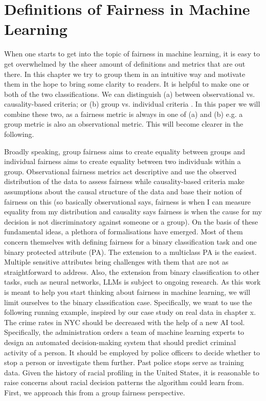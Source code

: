 \section*{Definitions of Fairness in Machine Learning}
When one starts to get into the topic of fairness in machine learning, it is easy to get overwhelmed by the sheer amount of definitions and metrics that are out there. In this chapter we try to group them in an intuitive way and motivate them in the hope to bring some clarity to readers. It is helpful to make one or both of the two classifications. We can distinguish (a) between observational vs. causality-based criteria; or (b) group vs. individual criteria \cite{castelnovo2022}. In this paper we will combine these two, as a fairness metric is always in one of (a) and (b) e.g. a group metric is also an observational metric. This will become clearer in the following.

Broadly speaking, group fairness aims to create equality between groups and individual fairness aims to create equality between two individuals within a group. Observational fairness metrics act descriptive and use the observed distribution of the data to assess fairness while causality-based criteria make assumptions about the causal structure of the data and base their notion of fairness on this (so basically observational says, fairness is when I can measure equality from my distribution and causality says fairness is when the cause for my decision is not discriminatory against someone or a group). On the basis of these fundamental ideas, a plethora of formalisations have emerged. Most of them concern themselves with defining fairness for a binary classification task and one binary protected attribute (PA). The extension to a multiclass PA is the easiest. Multiple sensitive attributes bring challenges with them that are not as straightforward to address. Also, the extension from binary classification to other tasks, such as neural networks, LLMs is subject to ongoing research. As this work is meant to help you start thinking about fairness in machine learning, we will limit ourselves to the binary classification case.
Specifically, we want to use the following running example, inspired by our case study on real data in chapter x. The crime rates in NYC should be decreased with the help of a new AI tool. Specifically, the administration orders a team of machine learning experts to design an automated decision-making system that should predict criminal activity of a person. It should be employed by police officers to decide whether to stop a person or investigate them further. Past police stops serve as training data. Given the history of racial profiling in the United States, it is reasonable to raise concerns about racial decision patterns the algorithm could learn from. First, we approach this from a group fairness perspective.

